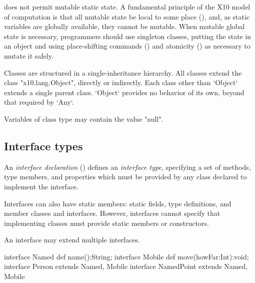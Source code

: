\Xten{} does not permit mutable static state. A fundamental principle of the
X10 model of computation is that all mutable state be local to some place
(), and, as static variables are globally available, they
cannot be mutable. When mutable global state is necessary, programmers should
use singleton classes, putting the state in an object and using place-shifting
commands () and atomicity () as necessary
to mutate it safely.


Classes are structured in a single-inheritance hierarchy. All classes extend
the class \xcd"x10.lang.Object", directly or indirectly. Each class other than
\xcd`Object` extends a single parent class.  \xcd`Object` provides no behavior
of its own, beyond that required by \xcd`Any`.




Variables of class  type may contain the value \xcd"null". 

\subsection{Interface types}
\label{InterfaceTypes}

An {\em interface declaration} () defines an {\em
interface type}, specifying a set of methods, type members, and
properties which must be provided by any class declared to implement the
interface. 


Interfaces can also have static members: static fields, type definitions,
and member classes and interfaces.  However, interfaces cannot specify that
implementing classes must provide static members or constructors.

An interface may extend multiple interfaces.  
\begin{xten}
interface Named {
  def name():String;
}
interface Mobile {
  def move(howFar:Int):void;
}
interface Person extends Named, Mobile {}
interface NamedPoint extends Named, Mobile {} 
\end{xten}
%


